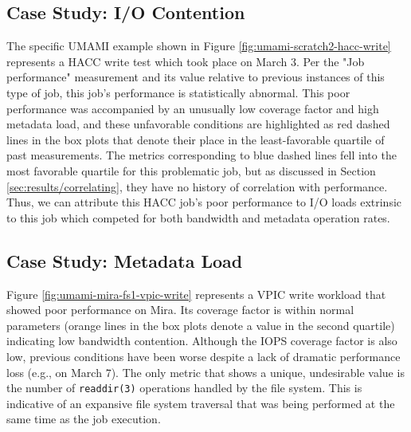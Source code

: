 
\subsection{Case Study: I/O Contention}

The specific UMAMI example shown in Figure \ref{fig:umami-scratch2-hacc-write} represents a HACC write test which took place on March 3.
Per the "Job performance" measurement and its value relative to previous instances of this type of job, this job's performance is statistically abnormal.
This poor performance was accompanied by an unusually low coverage factor and high metadata load, and these unfavorable conditions are highlighted as red dashed lines in the box plots that denote their place in the least-favorable quartile of past measurements.
The metrics corresponding to blue dashed lines fell into the most favorable quartile for this problematic job, but as discussed in Section \ref{sec:results/correlating}, they have no history of correlation with performance.
Thus, we can attribute this HACC job's poor performance to I/O loads extrinsic to this job which competed for both bandwidth and metadata operation rates.

\subsection{Case Study: Metadata Load}

Figure \ref{fig:umami-mira-fs1-vpic-write} represents a VPIC write workload
that showed poor performance on Mira.
Its coverage factor is within normal parameters (orange lines in the box plots denote a value in the second quartile) indicating low bandwidth contention.
Although the IOPS coverage factor is also low, previous conditions have been worse despite a lack of dramatic performance loss (e.g., on March 7).
The only metric that shows a unique, undesirable value is the number of \texttt{readdir(3)} operations handled by the file system.
This is indicative of an expansive file system traversal that was being performed at the same time as the job execution.

